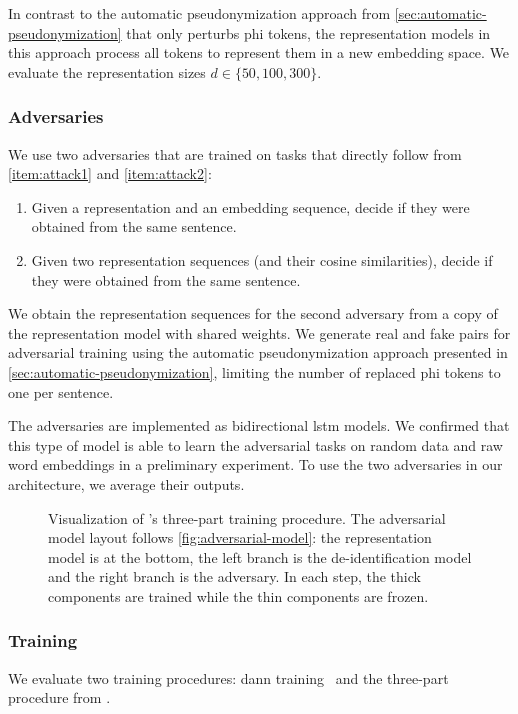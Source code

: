 %
In contrast to the automatic pseudonymization approach from \cref{sec:automatic-pseudonymization} that only perturbs \ac{phi} tokens, the representation models in this approach process all tokens to represent them in a new embedding space.
%
We evaluate the representation sizes $d \in \{50, 100, 300\}$. 

\subsubsection{Adversaries}
%
We use two adversaries that are trained on tasks that directly follow from \ref{item:attack1} and \ref{item:attack2}:
\begin{enumerate}[label=T\arabic*.,ref=T\arabic*]
    \item Given a representation and an embedding sequence, decide if they were obtained from the same sentence.
    \item Given two representation sequences (and their cosine similarities), decide if they were obtained from the same sentence.
\end{enumerate}

%
We obtain the representation sequences for the second adversary from a copy of the representation model with shared weights.
%
We generate real and fake pairs for adversarial training using the automatic pseudonymization approach presented in \cref{sec:automatic-pseudonymization}, limiting the number of replaced \ac{phi} tokens to one per sentence.

%
The adversaries are implemented as bidirectional \ac{lstm} models.
%
We confirmed that this type of model is able to learn the adversarial tasks on random data and raw word embeddings in a preliminary experiment.
%
To use the two adversaries in our architecture, we average their outputs.

 \begin{figure}
    \centering
    
    \caption[Adversarial training procedure]{%
        Visualization of \citeauthor{feutry2018learning}'s three-part training procedure.
        The adversarial model layout follows \cref{fig:adversarial-model}: the representation model is at the bottom, the left branch is the de-identification model and the right branch is the adversary.
        In each step, the thick components are trained while the thin components are frozen.
    }\label{fig:feutry-training}
\end{figure}

\subsubsection{Training}
%
We evaluate two training procedures: \ac{dann} training~\citep{ganin2016domain} and the three-part procedure from \citet{feutry2018learning}.


